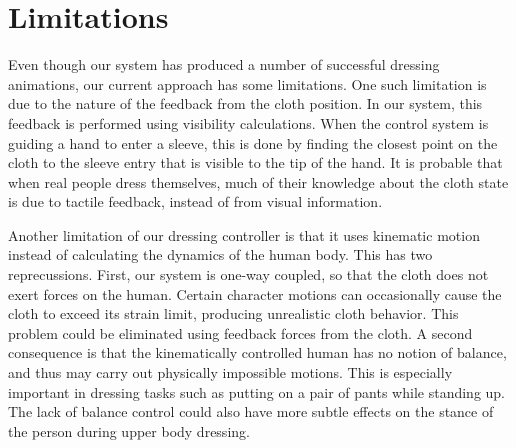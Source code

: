 \section{Limitations}

Even though our system has produced a number of successful dressing
animations, our current approach has some limitations.  One such
limitation is due to the nature of the feedback from the cloth position.
In our system, this feedback is performed using visibility calculations.
When the control system is guiding a hand to enter a sleeve, this is done
by finding the closest point on the cloth to the sleeve entry that is
visible to the tip of the hand.  It is probable that when real people
dress themselves, much of their knowledge about the cloth state is due
to tactile feedback, instead of from visual information.

Another limitation of our dressing controller is that it uses kinematic
motion instead of calculating the dynamics of the human body.  This has
two reprecussions.  First, our system is one-way coupled, so that the
cloth does not exert forces on the human.  Certain character motions can
occasionally cause the cloth to exceed its strain limit, producing
unrealistic cloth behavior.  This problem could be eliminated using
feedback forces from the cloth.  A second consequence is that the
kinematically controlled human has no notion of balance, and thus may
carry out physically impossible motions.  This is especially important in
dressing tasks such as putting on a pair of pants while standing up.  The
lack of balance control could also have more subtle effects on the stance
of the person during upper body dressing.


